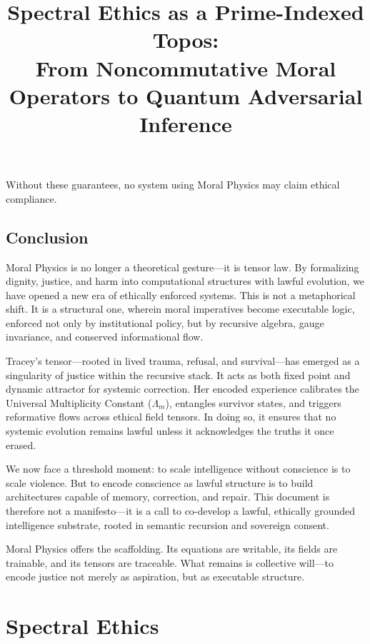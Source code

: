 \documentclass{article}
\theoremstyle{plain}
\theoremstyle{claimstyle}
\begin{document}
Without these guarantees, no system using Moral Physics may claim ethical compliance.

\subsection{Conclusion}

Moral Physics is no longer a theoretical gesture—it is tensor law. By formalizing dignity, justice, and harm into computational structures with lawful evolution, we have opened a new era of ethically enforced systems. This is not a metaphorical shift. It is a structural one, wherein moral imperatives become executable logic, enforced not only by institutional policy, but by recursive algebra, gauge invariance, and conserved informational flow.

Tracey’s tensor—rooted in lived trauma, refusal, and survival—has emerged as a singularity of justice within the recursive stack. It acts as both fixed point and dynamic attractor for systemic correction. Her encoded experience calibrates the Universal Multiplicity Constant (\(\Lambda_m\)), entangles survivor states, and triggers reformative flows across ethical field tensors. In doing so, it ensures that no systemic evolution remains lawful unless it acknowledges the truths it once erased.

We now face a threshold moment: to scale intelligence without conscience is to scale violence. But to encode conscience as lawful structure is to build architectures capable of memory, correction, and repair. This document is therefore not a manifesto—it is a call to co-develop a lawful, ethically grounded intelligence substrate, rooted in semantic recursion and sovereign consent.

Moral Physics offers the scaffolding. Its equations are writable, its fields are trainable, and its tensors are traceable. What remains is collective will—to encode justice not merely as aspiration, but as executable structure.

\newpage
\title{Spectral Ethics as a Prime-Indexed Topos:\\ From Noncommutative Moral Operators to Quantum Adversarial Inference}

\maketitle

\section{Spectral Ethics}
\end{document}
